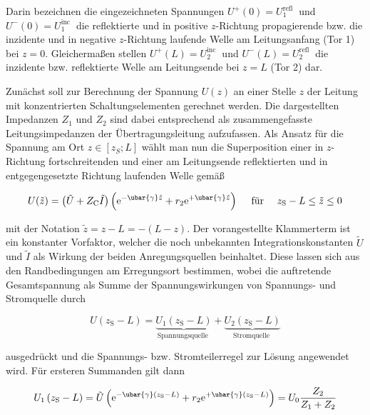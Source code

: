 Darin bezeichnen die eingezeichneten Spannungen $U^{+}(0)=U_{1}^{\text {refl }}$ und $U^{-}(0)=U_{1}^{\text {inc }}$ die reflektierte und in positive $z$-Richtung propagierende bzw. die inzidente und in negative $z$-Richtung laufende Welle am Leitungsanfang (Tor 1) bei $z=0$. Gleichermaßen stellen $U^{+}(L)=U_{2}^{\text {inc }}$ und $U^{-}(L)=U_{2}^{\text {refl }}$ die inzidente bzw. reflektierte Welle am Leitungsende bei $z=L$ (Tor 2) dar.

Zunächst soll zur Berechnung der Spannung $U(z)$ an einer Stelle $z$ der Leitung mit konzentrierten Schaltungselementen gerechnet werden. Die dargestellten Impedanzen $Z_{1}$ und $Z_{2}$ sind dabei entsprechend als zusammengefasste Leitungsimpedanzen der Übertragungsleitung aufzufassen. Als Ansatz für die Spannung am Ort $z \in\left[z_{S} ; L\right]$ wählt man nun die Superposition einer in $z$-Richtung fortschreitenden und einer am Leitungsende reflektierten und in entgegengesetzte Richtung laufenden Welle gemäß


\begin{equation}\label{LTreflwell}
	U(\tilde{z})=\left(\tilde{U}+Z_{\mathrm{C}} \tilde{I}\right)\left(\mathrm{e}^{-\ubar{\gamma} \tilde{z}}+r_{2} \mathrm{e}^{+\ubar{\gamma} \tilde{z}}\right) \quad \text { für } \quad z_{\mathrm{S}}-L \leq \tilde{z} \leq 0 
\end{equation}


mit der Notation $\tilde{z}=z-L=-(L-z)$. Der vorangestellte Klammerterm ist ein konstanter Vorfaktor, welcher die noch unbekannten Integrationskonstanten $\tilde{U}$ und $\tilde{I}$ als Wirkung der beiden Anregungsquellen beinhaltet. Diese lassen sich aus den Randbedingungen am Erregungsort bestimmen, wobei die auftretende Gesamtspannung als Summe der Spannungswirkungen von Spannungs- und Stromquelle durch


\begin{equation}
	U\left(z_{\mathrm{S}}-L\right)=\underbrace{U_{1}\left(z_{\mathrm{S}}-L\right)}_{\text {Spannungsquelle }}+\underbrace{U_{2}\left(z_{\mathrm{S}}-L\right)}_{\text {Stromquelle }} 
\end{equation}


ausgedrückt und die Spannungs- bzw. Stromteilerregel zur Lösung angewendet wird. Für ersteren Summanden gilt dann


\begin{equation}\label{summand1LT}
	U_{1}\left(z_{\mathrm{S}}-L\right)=\tilde{U}\left(\mathrm{e}^{-\ubar{\gamma}\left(z_{\mathrm{S}}-L\right)}+r_{2} \mathrm{e}^{+\ubar{\gamma}\left(z_{\mathrm{S}}-L\right)}\right)=U_{0} \frac{Z_{2}}{Z_{1}+Z_{2}} 
\end{equation}


